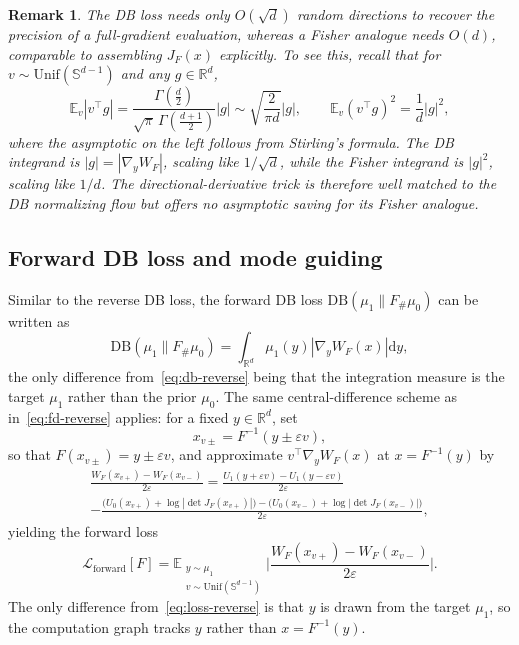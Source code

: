 \documentclass{article}
\newtheorem*{remark}{Remark}
\newcommand{\D}{\mathrm{d}}
\newcommand{\DB}{\mathrm{DB}}
\theoremstyle{plain}
\begin{document}
\begin{remark}
The DB loss needs only $O(\sqrt d)$ random directions to recover the precision of a full-gradient evaluation, whereas a Fisher analogue needs $O(d)$, comparable to assembling $J_F(x)$ explicitly. To see this, recall that for $v \sim \mathrm{Unif}(\mathbb S^{d-1})$ and any $g \in \mathbb R^d$,
\begin{equation*}
    \mathbb E_v |v^\top g| = \frac{\Gamma(\frac{d}2)}{\sqrt{\pi}\, \Gamma(\frac{d+1}2)} |g| \sim \sqrt{\frac{2}{\pi d}} |g|, \qquad \mathbb E_v (v^\top g)^2 = \frac{1}{d} |g|^2,
\end{equation*}
where the asymptotic on the left follows from Stirling's formula. The DB integrand is $|g| = |\nabla_y W_F|$, scaling like $1/\sqrt d$, while the Fisher integrand is $|g|^2$, scaling like $1/d$. The directional-derivative trick is therefore well matched to the DB normalizing flow but offers no asymptotic saving for its Fisher analogue.
\end{remark}

\subsection{Forward DB loss and mode guiding}

Similar to the reverse DB loss, the forward DB loss $\DB(\mu_1\|F_{\#}\mu_0)$ can be written as
\begin{equation}\label{eq:db-forward}
    \DB(\mu_1\|F_{\#}\mu_0) = \int_{\mathbb R^d} \mu_1(y) |\nabla_y W_F(x)| \D y,
\end{equation}
the only difference from~\eqref{eq:db-reverse} being that the integration measure is the target $\mu_1$ rather than the prior $\mu_0$. The same central-difference scheme as in~\eqref{eq:fd-reverse} applies: for a fixed $y \in \mathbb R^d$, set
\begin{equation}\label{eq:xpm-forward}
    x_{v\pm} = F^{-1}(y \pm \varepsilon v),
\end{equation}
so that $F(x_{v\pm}) = y \pm \varepsilon v$, and approximate $v^\top \nabla_y W_F(x)$ at $x = F^{-1}(y)$ by
\begin{multline}\label{eq:fd-forward-explicit}
    \frac{W_F(x_{v+}) - W_F(x_{v-})}{2\varepsilon} = \frac{U_1(y + \varepsilon v) - U_1(y - \varepsilon v)}{2\varepsilon} \\
    - \frac{\bigl(U_0(x_{v+}) + \log|\det J_F(x_{v+})|\bigr) - \bigl(U_0(x_{v-}) + \log|\det J_F(x_{v-})|\bigr)}{2\varepsilon},
\end{multline}
yielding the forward loss
\begin{equation}\label{eq:loss-forward}
    \mathcal L_{\mathrm{forward}}[F] = \mathbb E_{\substack{y \sim \mu_1 \\ v \sim \mathrm{Unif}(\mathbb S^{d-1})}} \biggl|\frac{W_F(x_{v+}) - W_F(x_{v-})}{2\varepsilon}\biggr|.
\end{equation}
The only difference from~\eqref{eq:loss-reverse} is that $y$ is drawn from the target $\mu_1$, so the computation graph tracks $y$ rather than $x = F^{-1}(y)$.
\end{document}
